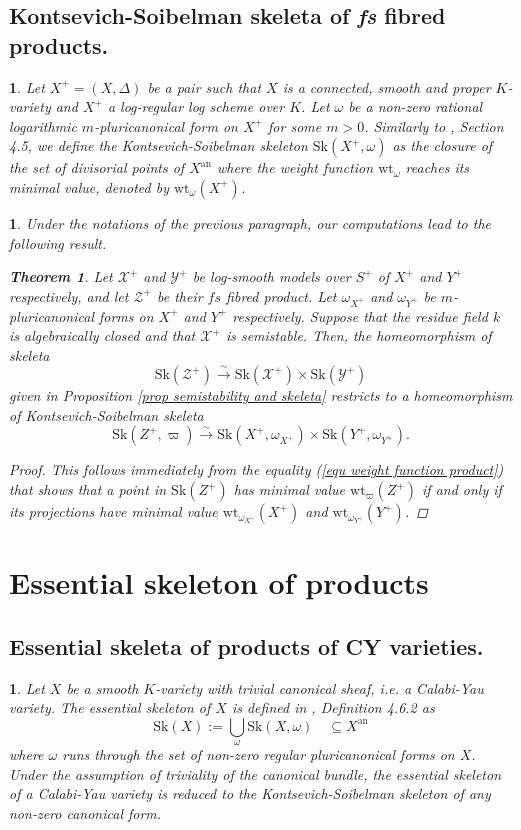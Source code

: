 \documentclass{amsart}%
\numberwithin{equation}{subsection}
\theoremstyle{plain2}
\newtheorem{thm}[equation]{Theorem}
\theoremstyle{definition2}
\theoremstyle{stepstyle}
\theoremstyle{point}
\theoremstyle{subpoint}
\newtheorem{subpoint}[equation]{}%
\newcommand{\spa}[1]{\begin{subpoint}#1\end{subpoint}}           %
\newcommand{\cX}{\ensuremath{\mathscr{X}}}
\newcommand{\cY}{\ensuremath{\mathscr{Y}}}
\newcommand{\cZ}{\ensuremath{\mathscr{Z}}}
\renewcommand{\cZ}{\ensuremath{\mathscr{Z}}}
\renewcommand{\cY}{\ensuremath{\mathscr{Y}}}
\newcommand{\weight}{\mathrm{wt}}
\newcommand{\Sk}{\mathrm{Sk}}
\begin{document}
\subsection{Kontsevich-Soibelman skeleta of \textit{fs} fibred products.}
\spa{Let $X^+=(X,\Delta)$ be a pair such that $X$ is a connected, smooth and proper $K$-variety and $X^+$ a log-regular log scheme over $K$. Let $\omega$ be a non-zero rational logarithmic $m$-pluricanonical form on $X^+$ for some $m>0$. Similarly to \cite{MustataNicaise}, Section 4.5, we define the Kontsevich-Soibelman skeleton $\Sk(X^+, \omega)$ as the closure of the set of divisorial points of $X^\text{an}$ where the weight function $\weight_\omega$ reaches its minimal value, denoted by $\weight_{\omega}(X^+)$.}

\spa{Under the notations of the previous paragraph, our computations lead to the following result.
\begin{thm}  \label{thm semistability and KS skeleta}
Let $\cX^+$ and $\cY^+$ be log-smooth models over $S^+$ of $X^+$ and $Y^+$ respectively, and let $\cZ^+$ be their $fs$ fibred product. Let $\omega_{X^+}$ and $\omega_{Y^+}$ be  $m$-pluricanonical forms on $X^+$ and $Y^+$ respectively. Suppose that the residue field $k$ is algebraically closed and that $\cX^+$ is semistable. Then, the homeomorphism of skeleta $$\Sk(\cZ^+) \xrightarrow{\sim} \Sk(\cX^+) \times \Sk(\cY^+)$$ given in Proposition \ref{prop semistability and skeleta} restricts to a homeomorphism of Kontsevich-Soibelman skeleta $$\Sk(Z^+, \varpi) \xrightarrow{\sim} \Sk(X^+, \omega_{X^+}) \times \Sk(Y^+, \omega_{Y^+}).$$ 
\end{thm}
\begin{proof}
This follows immediately from the equality (\ref{equ weight function product}) that shows that a point in $\Sk(Z^+)$ has minimal value $\weight_{\varpi}(Z^+)$ if and only if its projections have minimal value $\weight_{\omega_{X^+}}(X^+)$ and $\weight_{\omega_{Y^+}}(Y^+)$.
\end{proof}
}

\section{Essential skeleton of products}
\subsection{Essential skeleta of products of CY varieties.}

\spa{Let $X$ be a smooth $K$-variety with trivial canonical sheaf, i.e. a Calabi-Yau variety. The essential skeleton of $X$ is defined in \cite{MustataNicaise}, Definition 4.6.2 as $$\Sk(X):=\bigcup_{\omega} \Sk(X, \omega) \quad \subseteq X^{\text{an}}$$ where $\omega$ runs through the set of non-zero regular pluricanonical forms on $X$. Under the assumption of triviality of the canonical bundle, the essential skeleton of a Calabi-Yau variety is reduced to the Kontsevich-Soibelman skeleton of any non-zero canonical form.}
\end{document}

